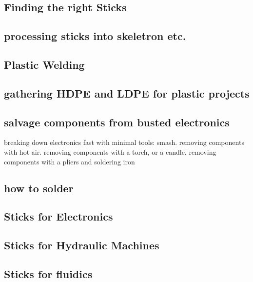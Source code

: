 \subsection{Finding the right Sticks}\label{finding-the-right-sticks}

\subsection{processing sticks into skeletron
etc.}\label{processing-sticks-into-skeletron-etc.}

\subsection{Plastic Welding}\label{plastic-welding}

\subsection{gathering HDPE and LDPE for plastic
projects}\label{gathering-hdpe-and-ldpe-for-plastic-projects}

\subsection{salvage components from busted
electronics}\label{salvage-components-from-busted-electronics}

breaking down electronics fast with minimal tools: smash. removing
components with hot air. removing components with a torch, or a candle.
removing components with a pliers and soldering iron

\subsection{how to solder}\label{how-to-solder}

\subsection{Sticks for Electronics}\label{sticks-for-electronics}

\subsection{Sticks for Hydraulic
Machines}\label{sticks-for-hydraulic-machines}

\subsection{Sticks for fluidics}\label{sticks-for-fluidics}

